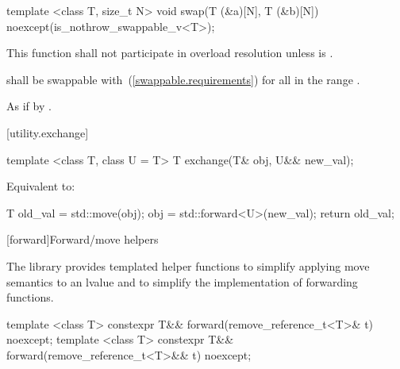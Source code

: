 %
\begin{itemdecl}
template <class T, size_t N>
  void swap(T (&a)[N], T (&b)[N]) noexcept(is_nothrow_swappable_v<T>);
\end{itemdecl}

\begin{itemdescr}
\pnum
\remarks
This function shall not participate in overload resolution
unless  is .

\pnum
\requires
{} shall be swappable with~(\ref{swappable.requirements}) 
for all  in the range .

\pnum
\effects As if by .
\end{itemdescr}

[utility.exchange]{}

%
\begin{itemdecl}
template <class T, class U = T> T exchange(T& obj, U&& new_val);
\end{itemdecl}

\begin{itemdescr}
\pnum
\effects
Equivalent to:
\begin{codeblock}
T old_val = std::move(obj);
obj = std::forward<U>(new_val);
return old_val;
\end{codeblock}
\end{itemdescr}


[forward]{Forward/move helpers}

\pnum
The library provides templated helper functions to simplify
applying move semantics to an lvalue and to simplify the implementation
of forwarding functions.

%
\begin{itemdecl}
template <class T> constexpr T&& forward(remove_reference_t<T>& t) noexcept;
template <class T> constexpr T&& forward(remove_reference_t<T>&& t) noexcept;
\end{itemdecl}

